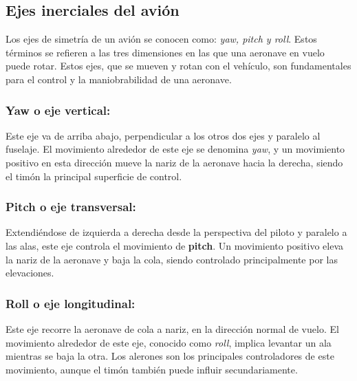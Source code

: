
\subsection{Ejes inerciales del avión}

Los ejes de simetría de un avión se conocen como: \textit{yaw, pitch y roll}. Estos términos se refieren a las tres dimensiones en las que una aeronave en vuelo puede rotar. Estos ejes, que se mueven y rotan con el vehículo, son fundamentales para el control y la maniobrabilidad de una aeronave. \cite{UAV2}
\vspace{5 px}

\subsubsection{Yaw o eje vertical:} Este eje va de arriba abajo, perpendicular a los otros dos ejes y paralelo al fuselaje. El movimiento alrededor de este eje se denomina \textit{yaw}, y un movimiento positivo en esta dirección mueve la nariz de la aeronave hacia la derecha, siendo el timón la principal superficie de control.\cite{UAV2}
\vspace{5 px}
\subsubsection{Pitch o eje transversal:} Extendiéndose de izquierda a derecha desde la perspectiva del piloto y paralelo a las alas, este eje controla el movimiento de \textbf{pitch}. Un movimiento positivo eleva la nariz de la aeronave y baja la cola, siendo controlado principalmente por las elevaciones.\cite{UAV2}\\

\subsubsection{Roll o eje longitudinal:} Este eje recorre la aeronave de cola a nariz, en la dirección normal de vuelo. El movimiento alrededor de este eje, conocido como \textit{roll}, implica levantar un ala mientras se baja la otra. Los alerones son los principales controladores de este movimiento, aunque el timón también puede influir secundariamente.\cite{UAV2}\\

